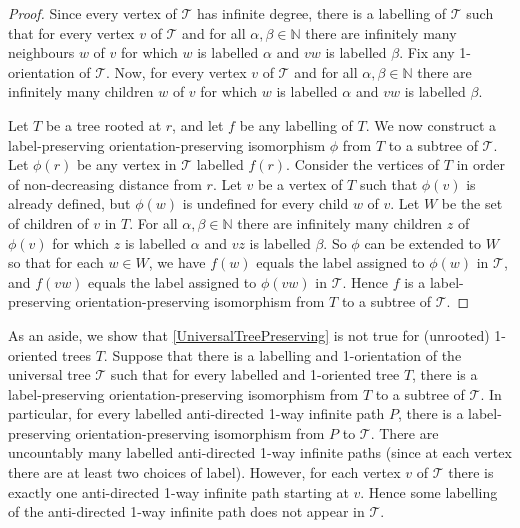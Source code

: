 \documentclass[a4paper,11pt]{article}
\theoremstyle{plain}
\theoremstyle{definition}
\newcommand{\TT}{\mathcal{T}}
\newcommand{\NN}{\mathbb{N}}
\begin{document}
\begin{proof}
Since every vertex of $\TT$ has infinite degree, there is a labelling of $\TT$ such that for every vertex $v$ of $\TT$ and for all $\alpha,\beta\in\NN$ there are infinitely many neighbours $w$ of $v$ for which $w$ is labelled $\alpha$ and $vw$ is labelled $\beta$. Fix any 1-orientation of $\TT$. Now, for every vertex $v$ of $\TT$ and for all $\alpha,\beta\in\NN$ there are infinitely many children $w$ of $v$ for which $w$ is labelled $\alpha$ and $vw$ is labelled $\beta$. 

Let $T$ be a tree rooted at $r$, and let $f$ be any labelling of $T$. We now construct a label-preserving orientation-preserving isomorphism $\phi$ from $T$ to a subtree of $\TT$. Let $\phi(r)$ be any vertex in $\TT$ labelled $f(r)$. Consider the vertices of $T$ in order of non-decreasing distance from $r$. Let $v$ be a vertex of $T$ such that $\phi(v)$ is already defined, but $\phi(w)$ is undefined for every child $w$ of $v$. Let $W$ be the set of children of $v$ in $T$. For all $\alpha,\beta\in\NN$ there are infinitely many children $z$ of $\phi(v)$ for which $z$ is labelled $\alpha$ and $vz$ is labelled $\beta$. So $\phi$ can be extended to $W$ so that for each $w\in W$, we have $f(w)$ equals the label assigned to $\phi(w)$ in $\TT$, and $f(vw)$ equals the label assigned to $\phi(vw)$ in $\TT$. Hence $f$ is a label-preserving orientation-preserving isomorphism from $T$ to a subtree of $\TT$.
\end{proof}

As an aside, we show that \cref{UniversalTreePreserving} is not true for (unrooted) 1-oriented trees $T$. Suppose that there is a labelling and 1-orientation of the universal tree $\TT$ such that for every labelled and 1-oriented tree $T$, there is a label-preserving orientation-preserving isomorphism from $T$ to a subtree of $\TT$. In particular, for every labelled anti-directed 1-way infinite path $P$, there is a label-preserving orientation-preserving isomorphism from $P$ to $\TT$. There are uncountably many labelled anti-directed 1-way infinite paths (since at each vertex there are at least two choices of label). However, for each vertex $v$ of $\TT$ there is exactly one anti-directed 1-way infinite path starting at $v$. Hence some labelling of the anti-directed 1-way infinite path does not appear in $\TT$. 
\end{document}
